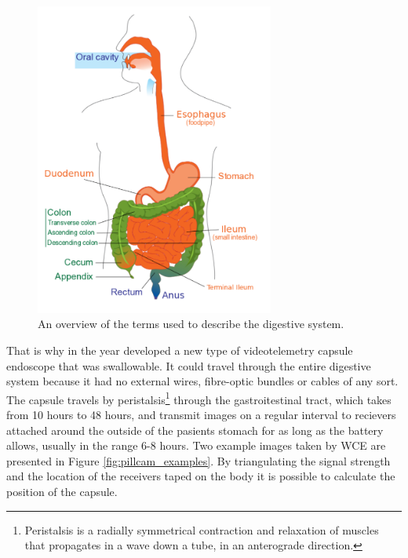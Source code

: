 \documentclass[english, a4paper]{report}
\begin{document}
\begin{figure} %
  \begin{center}
    \includegraphics[width=0.7\textwidth]{digestive-system}
    \caption{An overview of the terms used to describe the digestive system. \cite{DigestiveSystem} }
    \label{fig:digestive_system}
  \end{center}
\end{figure}

That is why in the year \citeyear{WirelessCapsule00} \citeauthor*{WirelessCapsule00} \cite{WirelessCapsule00} developed a new type of videotelemetry capsule endoscope that was swallowable. It could travel through the entire digestive system because it had no external wires, fibre-optic bundles or cables of any sort. The capsule travels by peristalsis\footnote{Peristalsis is a radially symmetrical contraction and relaxation of muscles that propagates in a wave down a tube, in an anterograde direction.} through the gastroitestinal tract, which takes from 10 hours to 48 hours, and transmit images on a regular interval to recievers attached around the outside of the pasients stomach for as long as the battery allows, usually in the range 6-8 hours. Two example images taken by WCE are presented in Figure \ref{fig:pillcam_examples}. By triangulating the signal strength and the location of the receivers taped on the body it is possible to calculate the position of the capsule.
\end{document}
